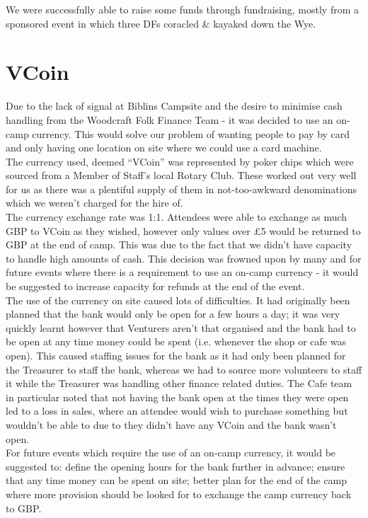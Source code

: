 We were successfully able to raise some funds through fundraising, mostly from a sponsored event in which three DFs coracled \& kayaked down the Wye. 

\section{VCoin}
Due to the lack of signal at Biblins Campsite and the desire to minimise cash handling from the Woodcraft Folk Finance Team - it was decided to use an on-camp currency. This would solve our problem of wanting people to pay by card and only having one location on site where we could use a card machine.\\

The currency used, deemed ``VCoin'' was represented by poker chips which were sourced from a Member of Staff's local Rotary Club. These worked out very well for us as there was a plentiful supply of them in not-too-awkward denominations which we weren't charged for the hire of.\\

The currency exchange rate was 1:1. Attendees were able to exchange as much GBP to VCoin as they wished, however only values over \pounds5 would be returned to GBP at the end of camp. This was due to the fact that we didn't have capacity to handle high amounts of cash. This decision was frowned upon by many and for future events where there is a requirement to use an on-camp currency - it would be suggested to increase capacity for refunds at the end of the event.\\

The use of the currency on site caused lots of difficulties. It had originally been planned that the bank would only be open for a few hours a day; it was very quickly learnt however that Venturers aren't that organised and the bank had to be open at any time money could be spent (i.e. whenever the shop or cafe was open). This caused staffing issues for the bank as it had only been planned for the Treasurer to staff the bank, whereas we had to source more volunteers to staff it while the Treasurer was handling other finance related duties. The Cafe team in particular noted that not having the bank open at the times they were open led to a loss in sales, where an attendee would wish to purchase something but wouldn't be able to due to they didn't have any VCoin and the bank wasn't open. \\

For future events which require the use of an on-camp currency, it would be suggested to: define the opening hours for the bank further in advance; ensure that any time money can be spent on site; better plan for the end of the camp where more provision should be looked for to exchange the camp currency back to GBP. 

